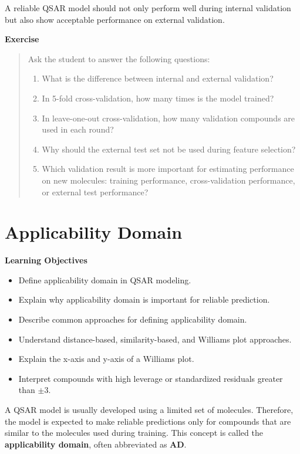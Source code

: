\documentclass[11pt]{report}
\newenvironment{Important note}{\begin{quote}\color{red}\textbf{Important note:} }{\end{quote}}
\newenvironment{learningobjectives}
{\vspace{0.5em}\noindent\textbf{Learning Objectives}\begin{itemize}[leftmargin=*]}
{\end{itemize}\vspace{0.5em}}
\newenvironment{exercise}
{\vspace{0.5em}\noindent\textbf{Exercise}\begin{quote}}
{\end{quote}\vspace{0.5em}}
\begin{document}
A reliable QSAR model should not only perform well during internal validation but also show acceptable performance on external validation.

\begin{exercise}
Ask the student to answer the following questions:

\begin{enumerate}[leftmargin=*]
    \item What is the difference between internal and external validation?
    \item In 5-fold cross-validation, how many times is the model trained?
    \item In leave-one-out cross-validation, how many validation compounds are used in each round?
    \item Why should the external test set not be used during feature selection?
    \item Which validation result is more important for estimating performance on new molecules: training performance, cross-validation performance, or external test performance?
\end{enumerate}
\end{exercise}

\chapter{Applicability Domain}

\begin{learningobjectives}
    \item Define applicability domain in QSAR modeling.
    \item Explain why applicability domain is important for reliable prediction.
    \item Describe common approaches for defining applicability domain.
    \item Understand distance-based, similarity-based, and Williams plot approaches.
    \item Explain the x-axis and y-axis of a Williams plot.
    \item Interpret compounds with high leverage or standardized residuals greater than $\pm 3$.
\end{learningobjectives}

A QSAR model is usually developed using a limited set of molecules. Therefore, the model is expected to make reliable predictions only for compounds that are similar to the molecules used during training. This concept is called the \textbf{applicability domain}, often abbreviated as \textbf{AD}.
\end{document}
